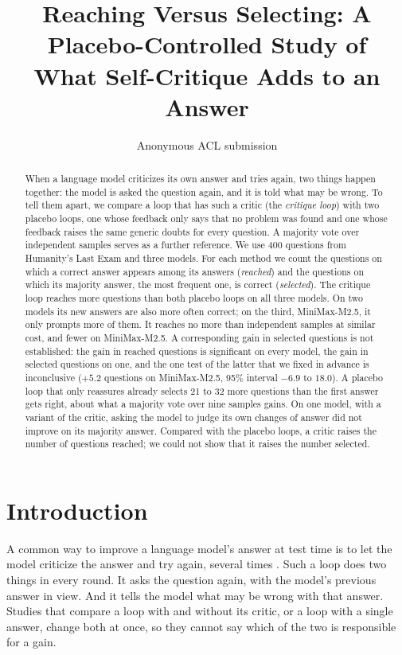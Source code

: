 \documentclass[11pt]{article}
\title{Reaching Versus Selecting: A Placebo-Controlled Study of\\What Self-Critique Adds to an Answer}
\author{Anonymous ACL submission}
\begin{document}
\maketitle

\begin{abstract}
When a language model criticizes its own answer and tries again, two things happen together: the model is asked the question again, and it is told what may be wrong.
To tell them apart, we compare a loop that has such a critic (the \emph{critique loop}) with two placebo loops, one whose feedback only says that no problem was found and one whose feedback raises the same generic doubts for every question.
A majority vote over independent samples serves as a further reference.
We use 400 questions from Humanity's Last Exam and three models.
For each method we count the questions on which a correct answer appears among its answers (\emph{reached}) and the questions on which its majority answer, the most frequent one, is correct (\emph{selected}).
The critique loop reaches more questions than both placebo loops on all three models.
On two models its new answers are also more often correct; on the third, MiniMax-M2.5, it only prompts more of them.
It reaches no more than independent samples at similar cost, and fewer on MiniMax-M2.5.
A corresponding gain in selected questions is not established: the gain in reached questions is significant on every model, the gain in selected questions on one, and the one test of the latter that we fixed in advance is inconclusive ($+5.2$ questions on MiniMax-M2.5, 95\% interval $-6.9$ to $18.0$).
A placebo loop that only reassures already selects 21 to 32 more questions than the first answer gets right, about what a majority vote over nine samples gains.
On one model, with a variant of the critic, asking the model to judge its own changes of answer did not improve on its majority answer.
Compared with the placebo loops, a critic raises the number of questions reached; we could not show that it raises the number selected.
\end{abstract}

\section{Introduction}

A common way to improve a language model's answer at test time is to let the model criticize the answer and try again, several times \citep{madaan2023selfrefine,shinn2023reflexion}.
Such a loop does two things in every round.
It asks the question again, with the model's previous answer in view.
And it tells the model what may be wrong with that answer.
Studies that compare a loop with and without its critic, or a loop with a single answer, change both at once, so they cannot say which of the two is responsible for a gain.
\end{document}
